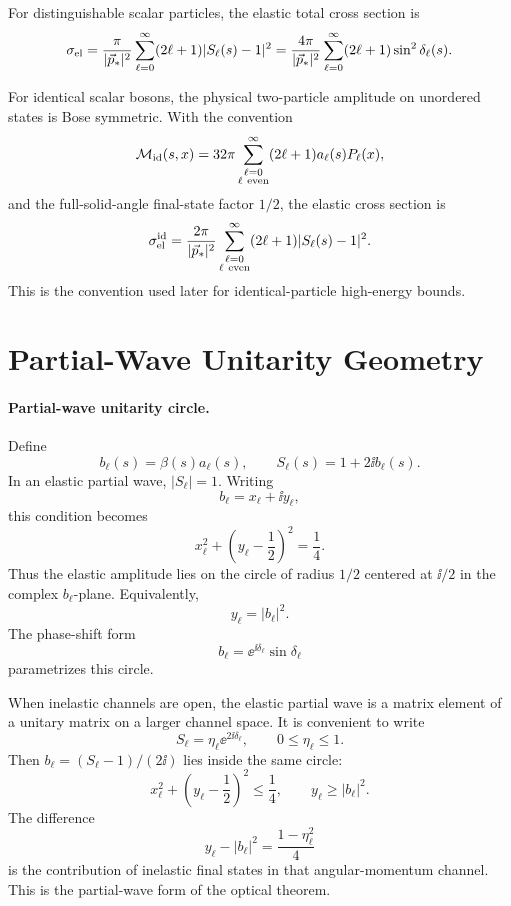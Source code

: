 For distinguishable scalar particles, the elastic total cross section is
\[
  \sigma_{\rm el}
  =
  \frac{\pi}{|\vec p_*|^2}
  \sum_{\ell=0}^\infty
  (2\ell+1)|S_\ell(s)-1|^2
  =
  \frac{4\pi}{|\vec p_*|^2}
  \sum_{\ell=0}^\infty
  (2\ell+1)\sin^2\delta_\ell(s).
\]

For identical scalar bosons, the physical two-particle amplitude on unordered
states is Bose symmetric.  With the convention
\[
  \mathcal M_{\rm id}(s,x)
  =
  32\pi
  \sum_{\substack{\ell=0\\ \ell\ {\rm even}}}^{\infty}
  (2\ell+1)a_\ell(s)P_\ell(x),
\]
and the full-solid-angle final-state factor \(1/2\), the elastic cross
section is
\[
  \sigma_{\rm el}^{\rm id}
  =
  \frac{2\pi}{|\vec p_*|^2}
  \sum_{\substack{\ell=0\\ \ell\ {\rm even}}}^{\infty}
  (2\ell+1)|S_\ell(s)-1|^2 .
\]
This is the convention used later for identical-particle high-energy bounds.

\section{Partial-Wave Unitarity Geometry}

\paragraph{Partial-wave unitarity circle.}
Define
\[
  b_\ell(s)=\beta(s)a_\ell(s),
  \qquad
  S_\ell(s)=1+2\ii b_\ell(s).
\]
In an elastic partial wave, \(|S_\ell|=1\).  Writing
\[
  b_\ell=x_\ell+\ii y_\ell,
\]
this condition becomes
\[
  x_\ell^2+\left(y_\ell-\frac12\right)^2=\frac14 .
\]
Thus the elastic amplitude lies on the circle of radius \(1/2\) centered at
\(\ii/2\) in the complex \(b_\ell\)-plane.  Equivalently,
\[
  y_\ell=|b_\ell|^2 .
\]
The phase-shift form
\[
  b_\ell=\ee^{\ii\delta_\ell}\sin\delta_\ell
\]
parametrizes this circle.

When inelastic channels are open, the elastic partial wave is a matrix
element of a unitary matrix on a larger channel space.  It is convenient to
write
\[
  S_\ell=\eta_\ell\ee^{2\ii\delta_\ell},
  \qquad
  0\le\eta_\ell\le1 .
\]
Then \(b_\ell=(S_\ell-1)/(2\ii)\) lies inside the same circle:
\[
  x_\ell^2+\left(y_\ell-\frac12\right)^2\le\frac14,
  \qquad
  y_\ell\ge |b_\ell|^2 .
\]
The difference
\[
  y_\ell-|b_\ell|^2
  =
  \frac{1-\eta_\ell^2}{4}
\]
is the contribution of inelastic final states in that angular-momentum
channel.  This is the partial-wave form of the optical theorem.

